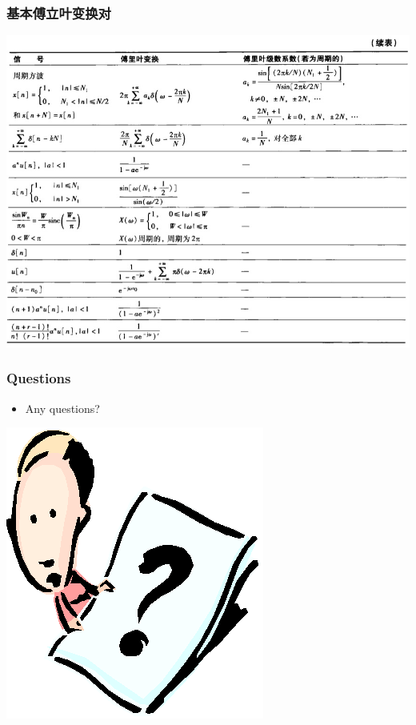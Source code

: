 \documentclass[CJKutf8,dvipsnames,table]{beamer}
\begin{document}
\begin{CJK*}{UTF8}{song}
  \begin{frame}
    \frametitle{基本傅立叶变换对}
    \begin{center}
      \includegraphics[scale=.32]{ss-c-t5-2b}
    \end{center}
  \end{frame}      
    
  \begin{frame}
    \frametitle{Questions}
    \begin{itemize}
    \item Any questions?
    \end{itemize}
    \begin{center}
      \includegraphics[scale=.5]{question}
    \end{center}
  \end{frame}       
        

\end{CJK*}
\end{document}
